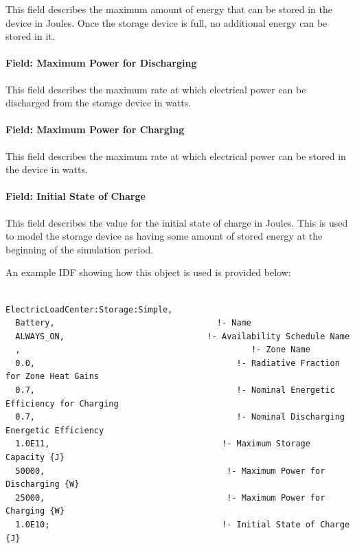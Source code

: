 This field describes the maximum amount of energy that can be stored in the device in Joules. Once the storage device is full, no additional energy can be stored in it.

\paragraph{Field: Maximum Power for Discharging}\label{field-maximum-power-for-discharging}

This field describes the maximum rate at which electrical power can be discharged from the storage device in watts.

\paragraph{Field: Maximum Power for Charging}\label{field-maximum-power-for-charging}

This field describes the maximum rate at which electrical power can be stored in the device in watts.

\paragraph{Field: Initial State of Charge}\label{field-initial-state-of-charge}

This field describes the value for the initial state of charge in Joules. This is used to model the storage device as having some amount of stored energy at the beginning of the simulation period.

An example IDF showing how this object is used is provided below:

\begin{lstlisting}

ElectricLoadCenter:Storage:Simple,
  Battery,                                 !- Name
  ALWAYS_ON,                             !- Availability Schedule Name
  ,                                               !- Zone Name
  0.0,                                         !- Radiative Fraction for Zone Heat Gains
  0.7,                                         !- Nominal Energetic Efficiency for Charging
  0.7,                                         !- Nominal Discharging Energetic Efficiency
  1.0E11,                                   !- Maximum Storage Capacity {J}
  50000,                                     !- Maximum Power for Discharging {W}
  25000,                                     !- Maximum Power for Charging {W}
  1.0E10;                                   !- Initial State of Charge {J}
\end{lstlisting}

